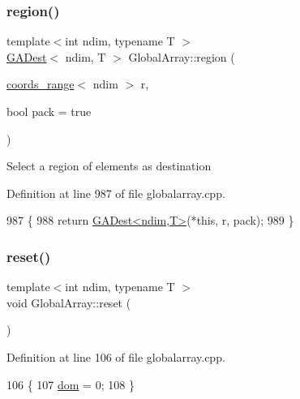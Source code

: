 \subsubsection{\texorpdfstring{region()}{region()}\hspace{0.1cm}{\footnotesize\ttfamily [2/2]}}
{\footnotesize\ttfamily template$<$int ndim, typename T $>$ \\
\hyperlink{classshark_1_1ndim_1_1_g_a_dest}{G\+A\+Dest}$<$ ndim, T $>$ Global\+Array\+::region (\begin{DoxyParamCaption}\item[{\hyperlink{structshark_1_1ndim_1_1coords__range}{coords\+\_\+range}$<$ ndim $>$}]{r,  }\item[{bool}]{pack = {\ttfamily true} }\end{DoxyParamCaption})}

Select a region of elements as destination 

Definition at line 987 of file globalarray.\+cpp.


\begin{DoxyCode}
987                                                                           \{
988     \textcolor{keywordflow}{return} \hyperlink{classshark_1_1ndim_1_1_g_a_dest}{GADest<ndim,T>}(*\textcolor{keyword}{this}, r, pack);
989 \}
\end{DoxyCode}
\hypertarget{classshark_1_1ndim_1_1_global_array_a8f1fa6f1d6408a1b34b35a50bf551733}{}\label{classshark_1_1ndim_1_1_global_array_a8f1fa6f1d6408a1b34b35a50bf551733} 
\subsubsection{\texorpdfstring{reset()}{reset()}}
{\footnotesize\ttfamily template$<$int ndim, typename T $>$ \\
void Global\+Array\+::reset (\begin{DoxyParamCaption}{ }\end{DoxyParamCaption})\hspace{0.3cm}{\ttfamily [private]}}



Definition at line 106 of file globalarray.\+cpp.


\begin{DoxyCode}
106                                 \{
107     \hyperlink{classshark_1_1ndim_1_1_global_array_a412e192f4c7a15888da625ae833e8d3e}{dom} = 0;
108 \}
\end{DoxyCode}
\hypertarget{classshark_1_1ndim_1_1_global_array_a9c72fd2f409389cb47a6f47bdfb77582}{}\label{classshark_1_1ndim_1_1_global_array_a9c72fd2f409389cb47a6f47bdfb77582} 
